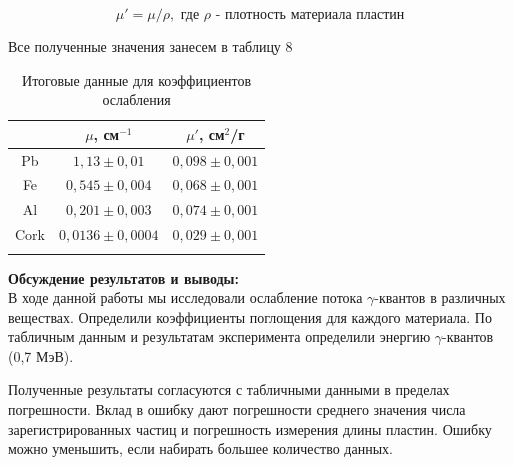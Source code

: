 \documentclass[a4paper, 12pt]{article}%
\begin{document}
\begin{enumerate}
	$$ \mu' = \mu/\rho, \text{		где $\rho$ - плотность материала пластин}$$ 
	
	Все полученные значения занесем в таблицу 8
	
	\begin{longtable}{|c|c|c|}
		\hline
		&    $\mu$, см$^{-1}$  & $\mu'$, см$^2$/г  \\ \hline
		Pb & $1,13\pm0,01$     & $0,098\pm0,001$   \\ \hline
		Fe & $0,545\pm0,004$    & $0,068\pm0,001$   \\ \hline
		Al & $0,201\pm0,003$    & $0,074\pm0,001$   \\ \hline
		Cork& $0,0136\pm0,0004$    & $0,029\pm0,001$   \\ \hline
		
		\caption{Итоговые данные для коэффициентов ослабления}
	\end{longtable}
	
	
	
	\end{enumerate}
	
	
	
	\textbf{Обсуждение результатов и выводы: }\\
	
	В ходе данной работы мы исследовали ослабление потока $\gamma$-квантов в различных веществах. Определили коэффициенты поглощения для каждого материала. По табличным данным и результатам эксперимента определили энергию $\gamma$-квантов (0,7 МэВ).
	
	Полученные результаты согласуются с табличными данными в пределах погрешности. Вклад в ошибку дают погрешности среднего значения числа зарегистрированных частиц и погрешность измерения длины пластин. Ошибку можно уменьшить, если набирать большее количество данных. 
	
	
	
	
	
	
	
	
	
	
	
	
	
	
	
	
	
	
\end{document}

